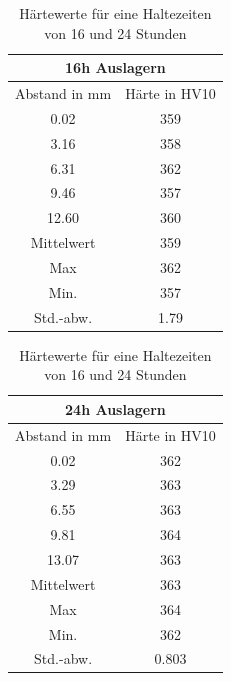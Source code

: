 \documentclass[a4paper, 11pt]{tubsreprt}
\begin{document}
\begin{table}
\begin{tabular}{c|c}
\multicolumn{2}{c}{16h Auslagern} \\
\hline
Abstand in mm &	Härte in HV10 \\
0.02	&	359 \\
3.16	&	358 \\
6.31	&	362 \\
9.46	&	357 \\
12.60	&	360 \\
\hline
Mittelwert	&	359 \\
Max	&	362 \\
Min.	&	357 \\
Std.-abw.	&	1.79 \\
\end{tabular}
\begin{tabular}{c|c}
\multicolumn{2}{c}{24h Auslagern} \\
\hline
Abstand in mm	&	Härte in HV10 \\

0.02	&	362 \\
3.29	&	363 \\
6.55	&	363 \\
9.81	&	364 \\ 
13.07	&	363 \\
\hline
Mittelwert	&	363 \\
Max	&	364 \\
Min.	&	362 \\
Std.-abw.	&	0.803 \\
\end{tabular}
\caption{Härtewerte für eine Haltezeiten von 16 und 24 Stunden}
\label{950 16 24}
\end{table}


\listoffigures
\listoftables
\end{document}
